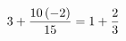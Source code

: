 \documentclass[preview]{standalone}
\begin{document}
\begin{align*}
\special{dvisvgm:raw <g id='unique000'>}3 + \frac{10 \left(-2\right)}{15} = 1 + \frac{2}{3}\special{dvisvgm:raw </g>}
\end{align*}
\end{document}
